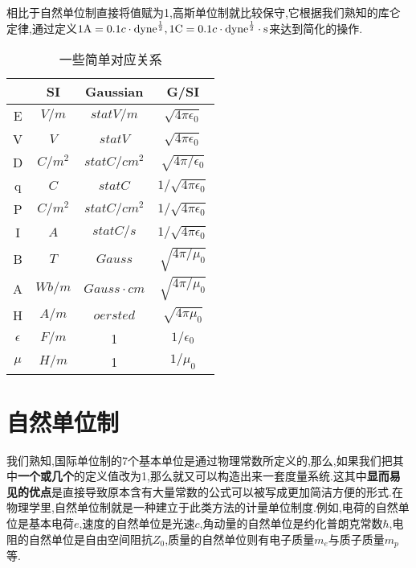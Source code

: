 \documentclass[lang=cn,newtx,10pt,scheme=chinese,thmcnt=section]{elegantbook}
\begin{document}
相比于自然单位制直接将值赋为1,高斯单位制就比较保守,它根据我们熟知的库仑定律,通过定义$1\mathrm{A}=0.1c\cdot\mathrm{dyne}^{\frac12},1\mathrm{C}=0.1c\cdot\rm{dyne}^{\frac12}\cdot s$来达到简化的操作.\\
\begin{table}[htbp]
	\centering
	\caption{一些简单对应关系}
	\begin{tabular}{|c|c|c|c|}
		\hline
		& SI      & Gaussian        & G/SI                     \\ \hline
		E          & $V/m$   & $statV/m$       & $\sqrt{4\pi\epsilon_0}$  \\ \hline
		V          & $V$     & $statV$         & $\sqrt{4\pi\epsilon_0}$  \\ \hline
		D          & $C/m^2$ & $statC/cm^2$    & $\sqrt{4\pi/\epsilon_0}$ \\ \hline
		q          & $C$     & $statC$         & $1/\sqrt{4\pi\epsilon_0}$ \\ \hline
		P          & $C/m^2$ & $statC/cm^2$    & $1/\sqrt{4\pi\epsilon_0}$ \\ \hline
		I          & $A$     & $statC/s$       & $1/\sqrt{4\pi\epsilon_0}$ \\ \hline
		B          & $T$     & $Gauss$         & $\sqrt{4\pi/\mu_0}$      \\ \hline
		A          & $Wb/m$  & $Gauss\cdot cm$ & $\sqrt{4\pi/\mu_0}$      \\ \hline
		H          & $A/m$   & $oersted$       & $\sqrt{4\pi\mu_0}$       \\ \hline
		$\epsilon$ & $F/m$   & 1               & $1/\epsilon_0$           \\ \hline
		$\mu$      & $H/m$   & 1               & $1/\mu_0$                \\ \hline
	\end{tabular}
\end{table}
\section{自然单位制}
我们熟知,国际单位制的7个基本单位是通过物理常数所定义的,那么,如果我们把其中\textbf{一个或几个}的定义值改为1,那么就又可以构造出来一套度量系统.这其中\textbf{显而易见的优点}是直接导致原本含有大量常数的公式可以被写成更加简洁方便的形式.在物理学里,自然单位制就是一种建立于此类方法的计量单位制度.例如,电荷的自然单位是基本电荷${\displaystyle e}$,速度的自然单位是光速${\displaystyle c}$,角动量的自然单位是约化普朗克常数${\displaystyle \hbar }$,电阻的自然单位是自由空间阻抗${\displaystyle Z_{0}}$,质量的自然单位则有电子质量${\displaystyle m_{e}}$与质子质量${\displaystyle m_{p}}$等.\\
\end{document}
